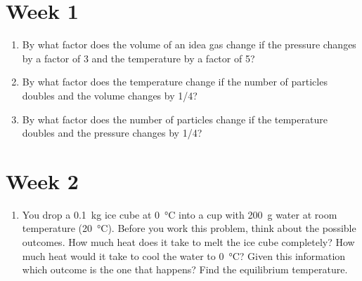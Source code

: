 

\section*{Week 1}
\begin{enumerate}
\setlength\itemsep{2 in}
\setcounter{enumi}{\value{counter}}
\item By what factor does the volume of an idea gas change if the pressure changes by a factor of 3 and the temperature by a factor of 5?

\item By what factor does the temperature change if the number of particles doubles and the volume changes by 1/4?

\item By what factor does the number of particles change if the temperature doubles and the pressure changes by 1/4?
	
\setcounter{counter}{\value{enumi}}
\end{enumerate}

\vspace{2in}

\section*{Week 2}
\begin{enumerate}
\setlength\itemsep{2 in}
\setcounter{enumi}{\value{counter}}
\item
You drop a \SI{0.1}{kg} ice cube at \SI{0}{\celsius} into a cup with \SI{200}{\gram} water at room temperature (\SI{20}{\celsius}). Before you work this problem, think about the possible outcomes. How much heat does it take to melt the ice cube completely? How much heat would it take to cool the water to \SI{0}{\celsius}? Given this information which outcome is the one that happens? Find the equilibrium temperature.  
	
\setcounter{counter}{\value{enumi}}
\end{enumerate}

\vspace{2in}

